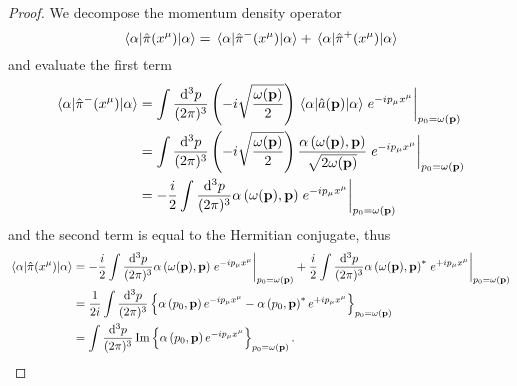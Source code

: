 \qkgcoherentmomentumdensitymean
\begin{proof}
	We decompose the momentum density operator
	\begin{equation*}
		\expval{\hat\pi(x^\mu)}{\alpha}
		=
		\expval{\hat\pi^-(x^\mu)}{\alpha}
		+
		\expval{\hat\pi^+(x^\mu)}{\alpha}
	\end{equation*}
	and evaluate the first term
	\begin{equation*}
		\begin{split}
			\expval{\hat\pi^-(x^\mu)}{\alpha}
			&=
			\int\frac{\dd[3]{p}}{(2\pi)^3}
			\left(
				-i
				\sqrt{\frac{\omega(\vb{p})}{2}}
			\right)
			\expval{\hat{a}(\vb{p})}{\alpha}
			\eval{e^{-ip_\mu x^\mu}}_{p_0=\omega(\vb{p})}
			\\
			&=
			\int\frac{\dd[3]{p}}{(2\pi)^3}
			\left(
				-i
				\sqrt{\frac{\omega(\vb{p})}{2}}
			\right)
			\frac{\alpha\left(\omega(\vb{p}),\vb{p}\right)}{\sqrt{2\omega(\vb{p})}}
			\eval{e^{-ip_\mu x^\mu}}_{p_0=\omega(\vb{p})}
			\\
			&=
			-
			\frac{i}{2}
			\int\frac{\dd[3]{p}}{(2\pi)^3}
			\alpha\left(\omega(\vb{p}),\vb{p}\right)
			\eval{e^{-ip_\mu x^\mu}}_{p_0=\omega(\vb{p})}
		\end{split}
	\end{equation*}
	and the second term is equal to the Hermitian conjugate, thus
	\begin{equation*}
		\begin{split}
			\expval{\hat\pi(x^\mu)}{\alpha}
			&=
			-
			\frac{i}{2}
			\int\frac{\dd[3]{p}}{(2\pi)^3}
			\alpha\left(\omega(\vb{p}),\vb{p}\right)
			\eval{e^{-ip_\mu x^\mu}}_{p_0=\omega(\vb{p})}
			+
			\frac{i}{2}
			\int\frac{\dd[3]{p}}{(2\pi)^3}
			\alpha\left(\omega(\vb{p}),\vb{p}\right)^*
			\eval{e^{+ip_\mu x^\mu}}_{p_0=\omega(\vb{p})}
			\\
			&=
			\frac{1}{2i}
			\int\frac{\dd[3]{p}}{(2\pi)^3}
			\left\{
				\alpha\left(p_0,\vb{p}\right)
				e^{-ip_\mu x^\mu}
				-
				\alpha\left(p_0,\vb{p}\right)^*
				e^{+ip_\mu x^\mu}
			\right\}_{p_0=\omega(\vb{p})}
			\\
			&=
			\int\frac{\dd[3]{p}}{(2\pi)^3}
			\Im\left\{
				\alpha\left(p_0,\vb{p}\right)
				e^{-ip_\mu x^\mu}			
			\right\}_{p_0=\omega(\vb{p})}
			.
		\end{split}
	\end{equation*}
\end{proof}
\qkgcoherentmomentumdensitycorr
